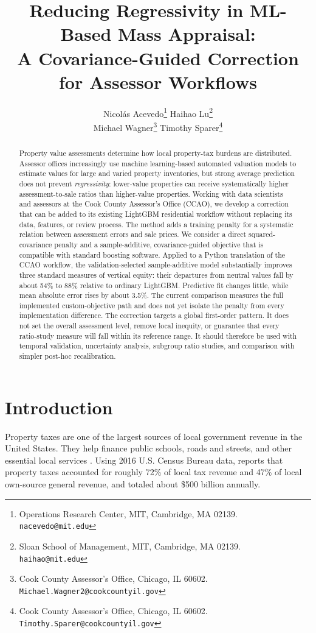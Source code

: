 \documentclass[10pt]{article}
\title{Reducing Regressivity in ML-Based Mass Appraisal:\\
A Covariance-Guided Correction for Assessor Workflows}
\author{
Nicol\'as Acevedo\thanks{Operations Research Center, MIT, Cambridge, MA 02139. \texttt{nacevedo@mit.edu}}
\qquad
Haihao Lu\thanks{Sloan School of Management, MIT, Cambridge, MA 02139. \texttt{haihao@mit.edu}}
\\[1ex]
Michael Wagner\thanks{Cook County Assessor's Office, Chicago, IL 60602. \texttt{Michael.Wagner2@cookcountyil.gov}}
\qquad
Timothy Sparer\thanks{Cook County Assessor's Office, Chicago, IL 60602. \texttt{Timothy.Sparer@cookcountyil.gov}}
}
\date{}
\theoremstyle{definition}
\newcommand{\1}{\mathbf{1}}
\newenvironment{advisorchanges}{\begingroup\color{blue}}{\endgroup}
\begin{document}
\maketitle

\begin{abstract}
\begin{advisorchanges}
Property value assessments determine how local property-tax burdens are distributed. Assessor offices increasingly use machine learning-based automated valuation models to estimate values for large and varied property inventories, but strong average prediction does not prevent \emph{regressivity}: lower-value properties can receive systematically higher assessment-to-sale ratios than higher-value properties. Working with data scientists and assessors at the Cook County Assessor's Office (CCAO), we develop a correction that can be added to its existing LightGBM residential workflow without replacing its data, features, or review process. The method adds a training penalty for a systematic relation between assessment errors and sale prices. We consider a direct squared-covariance penalty and a sample-additive, covariance-guided objective that is compatible with standard boosting software. Applied to a Python translation of the CCAO workflow, the validation-selected sample-additive model substantially improves three standard measures of vertical equity: their departures from neutral values fall by about 54\% to 88\% relative to ordinary LightGBM. Predictive fit changes little, while mean absolute error rises by about 3.5\%. The current comparison measures the full implemented custom-objective path and does not yet isolate the penalty from every implementation difference. The correction targets a global first-order pattern. It does not set the overall assessment level, remove local inequity, or guarantee that every ratio-study measure will fall within its reference range. It should therefore be used with temporal validation, uncertainty analysis, subgroup ratio studies, and comparison with simpler post-hoc recalibration.
\end{advisorchanges}
\end{abstract}

\section{Introduction}
\label{sec:introduction}

Property taxes are one of the largest sources of local government revenue in the United States. They help finance public schools, roads and streets, and other essential local services \cite{IAAO2020PropertyTaxPolicy}. Using 2016 U.S. Census Bureau data, \textcite{Berry2021} reports that property taxes accounted for roughly 72\% of local tax revenue and 47\% of local own-source general revenue, and totaled about \$500 billion annually.
\end{document}
